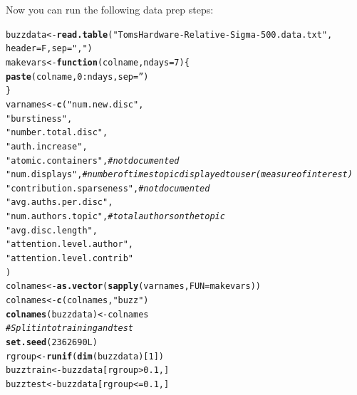 \documentclass{article}\usepackage[]{graphicx}\usepackage[]{color}
\makeatletter
\newcommand{\hlnum}[1]{\textcolor[rgb]{0.686,0.059,0.569}{#1}}%
\newcommand{\hlstr}[1]{\textcolor[rgb]{0.192,0.494,0.8}{#1}}%
\newcommand{\hlcom}[1]{\textcolor[rgb]{0.678,0.584,0.686}{\textit{#1}}}%
\newcommand{\hlopt}[1]{\textcolor[rgb]{0,0,0}{#1}}%
\newcommand{\hlstd}[1]{\textcolor[rgb]{0.345,0.345,0.345}{#1}}%
\newcommand{\hlkwa}[1]{\textcolor[rgb]{0.161,0.373,0.58}{\textbf{#1}}}%
\newcommand{\hlkwb}[1]{\textcolor[rgb]{0.69,0.353,0.396}{#1}}%
\newcommand{\hlkwc}[1]{\textcolor[rgb]{0.333,0.667,0.333}{#1}}%
\newcommand{\hlkwd}[1]{\textcolor[rgb]{0.737,0.353,0.396}{\textbf{#1}}}%
\newenvironment{kframe}{%
 \def\at@end@of@kframe{}%
 \ifinner\ifhmode%
  \def\at@end@of@kframe{\end{minipage}}%
  \begin{minipage}{\columnwidth}%
 \fi\fi%
 \def\FrameCommand##1{\hskip\@totalleftmargin \hskip-\fboxsep
 \colorbox{shadecolor}{##1}\hskip-\fboxsep
     \hskip-\linewidth \hskip-\@totalleftmargin \hskip\columnwidth}%
 \MakeFramed {\advance\hsize-\width
   \@totalleftmargin\z@ \linewidth\hsize
   \@setminipage}}%
 {\par\unskip\endMakeFramed%
 \at@end@of@kframe}
\newenvironment{knitrout}{}{} %
\makeatother
\begin{document}



Now you can run the following data prep steps:

\begin{knitrout}
\color{fgcolor}\begin{kframe}
\begin{alltt}
\hlstd{buzzdata} \hlkwb{<-} \hlkwd{read.table}\hlstd{(}\hlstr{"TomsHardware-Relative-Sigma-500.data.txt"}\hlstd{,}
                      \hlkwc{header}\hlstd{=F,} \hlkwc{sep}\hlstd{=}\hlstr{","}\hlstd{)}
\hlstd{makevars} \hlkwb{<-} \hlkwa{function}\hlstd{(}\hlkwc{colname}\hlstd{,} \hlkwc{ndays}\hlstd{=}\hlnum{7}\hlstd{) \{}
  \hlkwd{paste}\hlstd{(colname,} \hlnum{0}\hlopt{:}\hlstd{ndays,} \hlkwc{sep}\hlstd{=}\hlstr{''}\hlstd{)}
\hlstd{\}}
\hlstd{varnames} \hlkwb{<-} \hlkwd{c}\hlstd{(}\hlstr{"num.new.disc"}\hlstd{,}
             \hlstr{"burstiness"}\hlstd{,}
             \hlstr{"number.total.disc"}\hlstd{,}
             \hlstr{"auth.increase"}\hlstd{,}
             \hlstr{"atomic.containers"}\hlstd{,} \hlcom{# not documented}
             \hlstr{"num.displays"}\hlstd{,} \hlcom{# number of times topic displayed to user (measure of interest)}
             \hlstr{"contribution.sparseness"}\hlstd{,} \hlcom{# not documented}
             \hlstr{"avg.auths.per.disc"}\hlstd{,}
             \hlstr{"num.authors.topic"}\hlstd{,} \hlcom{# total authors on the topic}
             \hlstr{"avg.disc.length"}\hlstd{,}
             \hlstr{"attention.level.author"}\hlstd{,}
             \hlstr{"attention.level.contrib"}
\hlstd{)}
\hlstd{colnames} \hlkwb{<-} \hlkwd{as.vector}\hlstd{(}\hlkwd{sapply}\hlstd{(varnames,} \hlkwc{FUN}\hlstd{=makevars))}
\hlstd{colnames} \hlkwb{<-}  \hlkwd{c}\hlstd{(colnames,} \hlstr{"buzz"}\hlstd{)}
\hlkwd{colnames}\hlstd{(buzzdata)} \hlkwb{<-} \hlstd{colnames}
\hlcom{# Split into training and test}
\hlkwd{set.seed}\hlstd{(}\hlnum{2362690L}\hlstd{)}
\hlstd{rgroup} \hlkwb{<-} \hlkwd{runif}\hlstd{(}\hlkwd{dim}\hlstd{(buzzdata)[}\hlnum{1}\hlstd{])}
\hlstd{buzztrain} \hlkwb{<-} \hlstd{buzzdata[rgroup} \hlopt{>} \hlnum{0.1}\hlstd{,]}
\hlstd{buzztest} \hlkwb{<-} \hlstd{buzzdata[rgroup} \hlopt{<=}\hlnum{0.1}\hlstd{,]}
\end{alltt}
\end{kframe}
\end{knitrout}
\end{document}
